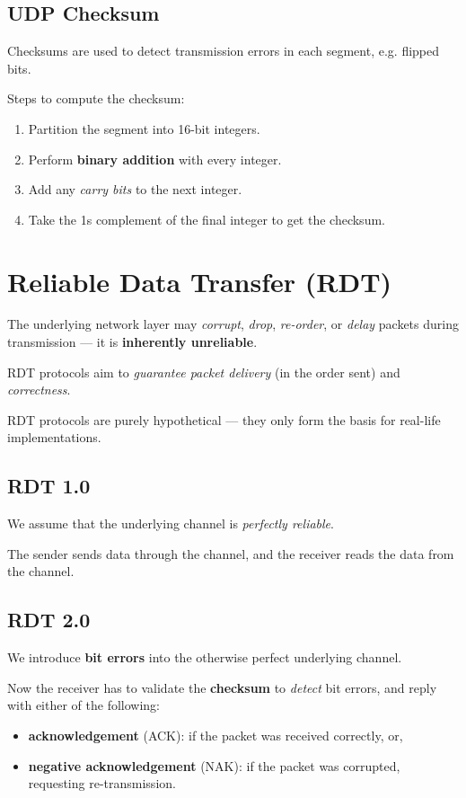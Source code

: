 \subsection{UDP Checksum}
Checksums are used to detect transmission errors in each segment, e.g. flipped bits.

Steps to compute the checksum:
\begin{enumerate}[leftmargin=*]
    \item Partition the segment into 16-bit integers.
    \item Perform \textbf{binary addition} with every integer.
    \item Add any \textit{carry bits} to the next integer.
    \item Take the 1s complement of the final integer to get the checksum.
\end{enumerate}


\section{Reliable Data Transfer (RDT)}
The underlying network layer may \textit{corrupt}, \textit{drop}, \textit{re-order},
or \textit{delay} packets during transmission --- it is \textbf{inherently unreliable}.

RDT protocols aim to \textit{guarantee packet delivery} (in the order sent) and \textit{correctness}.

RDT protocols are purely hypothetical --- they only form the basis for real-life implementations.

\subsection{RDT 1.0}
We assume that the underlying channel is \textit{perfectly reliable}.

The sender sends data through the channel, and the receiver reads the data from the channel.

\subsection{RDT 2.0}
We introduce \textbf{bit errors} into the otherwise perfect underlying channel.

Now the receiver has to validate the \textbf{checksum} to \textit{detect} bit errors,
and reply with either of the following:

\begin{itemize}
    \item \textbf{acknowledgement} (ACK): if the packet was received correctly, or,
    \item \textbf{negative acknowledgement} (NAK): if the packet was corrupted, requesting re-transmission.
\end{itemize}

